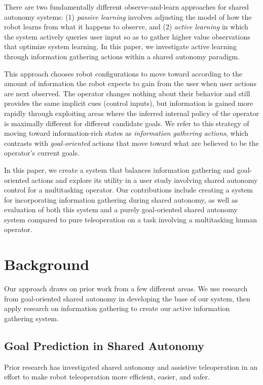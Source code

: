 \documentclass[conference]{IEEEtran}
\begin{document}
There are two fundamentally different observe-and-learn approaches for shared autonomy systems: (1) \textit{passive learning} involves adjusting the model of how the robot learns from what it happens to observe, and (2) \textit{active learning} in which the system actively queries user input so as to gather higher value observations that optimize system learning. In this paper, we investigate active learning through information gathering actions within a shared autonomy paradigm.

This approach chooses robot configurations to move toward according to the amount of information the robot expects to gain from the user when user actions are next observed. The operator changes nothing about their behavior and still provides the same implicit cues (control inputs), but information is gained more rapidly through exploiting areas where the inferred internal policy of the operator is maximally different for different candidate goals. We refer to this strategy of moving toward information-rich states as \textit{information gathering actions}, which contrasts with \textit{goal-oriented} actions that move toward what are believed to be the operator's current goals.

In this paper, we create a system that balances information gathering and goal-oriented actions and explore its utility in a user study involving shared autonomy control for a multitasking operator. Our contributions include creating a system for incorporating information gathering during shared autonomy, as well as evaluation of both this system and a purely goal-oriented shared autonomy system compared to pure teleoperation on a task involving a multitasking human operator.

\section{Background}

Our approach draws on prior work from a few different areas. We use research from goal-oriented shared autonomy in developing the base of our system, then apply research on information gathering to create our active information gathering system.

\subsection{Goal Prediction in Shared Autonomy}

Prior research has investigated shared autonomy and assistive teleoperation in an effort to make robot teleoperation more efficient, easier, and safer.
\end{document}
